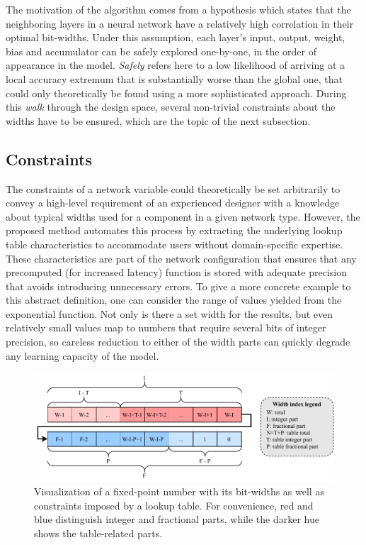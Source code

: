 The motivation of the algorithm comes from a hypothesis which states that the neighboring layers in a neural network have a relatively high correlation in their optimal bit-widths. Under this assumption, each layer's input, output, weight, bias and accumulator can be safely explored one-by-one, in the order of appearance in the model. \textit{Safely} refers here to a low likelihood of arriving at a local accuracy extremum that is substantially worse than the global one, that could only theoretically be found using a more sophisticated approach. During this \textit{walk} through the design space, several non-trivial constraints about the widths have to be ensured, which are the topic of the next subsection.

\subsection{Constraints}
The constraints of a network variable could theoretically be set arbitrarily to convey a high-level requirement of an experienced designer with a knowledge about typical widths used for a component in a given network type. However, the proposed method automates this process by extracting the underlying lookup table characteristics to accommodate users without domain-specific expertise. These characteristics are part of the network configuration that ensures that any precomputed (for increased latency) function is stored with adequate precision that avoids introducing unnecessary errors. To give a more concrete example to this abstract definition, one can consider the range of values yielded from the exponential function. Not only is there a set width for the results, but even relatively small values map to numbers that require several bits of integer precision, so careless reduction to either of the width parts can quickly degrade any learning capacity of the model.

\begin{figure}[hpt!]
  \centering
  \includegraphics[trim={0cm 0cm 0cm 0cm}, width=1.0\textwidth, center]{quantization/width_constraints.pdf}
  \caption{Visualization of a fixed-point number with its bit-widths as well as constraints imposed by a lookup table. For convenience, red and blue distinguish integer and fractional parts, while the darker hue shows the table-related parts.}
  \label{fig:width-constraints}
\end{figure}


